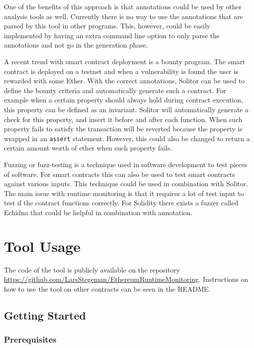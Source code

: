\documentclass[a4paper]{article}
\begin{document}
One of the benefits of this approach is that annotations could be used by other analysis tools as well. Currently there is no way to use the annotations that are parsed by this tool in other programs. This, however, could be easily implemented by having an extra command line option to only parse the annotations and not go in the generation phase. \par
A recent trend with smart contract deployment is a bounty program. The smart contract is deployed on a testnet and when a vulnerability is found the user is rewarded with some Ether. With the correct annotations, Solitor can be used to define the bounty criteria and automatically generate such a contract. For example when a certain property should always hold during contract execution, this property can be defined as an invariant. Solitor will automatically generate a check for this property, and insert it before and after each function. When such property fails to satisfy the transaction will be reverted because the property is wrapped in an \texttt{assert} statement. However, this could also be changed to return a certain amount worth of ether when such property fails. \par
Fuzzing or fuzz-testing is a technique used in software development to test pieces of software. For smart contracts this can also be used to test smart contracts against various inputs. This technique could be used in combination with Solitor. The main issue with runtime monitoring is that it requires a lot of test input to test if the contract functions correctly. For Solidity there exists a fuzzer called Echidna \cite{echidnafuzzer} that could be helpful in combination with annotation.

\newpage
\appendix
\section{Tool Usage}
\label{app:toolusage}
The code of the tool is publicly available on the repository \url{https://github.com/LarsStegeman/EthereumRuntimeMonitoring}. Instructions on how to use the tool on other contracts can be seen in the README.

\hypertarget{getting-started}{%
\subsection{Getting Started}\label{getting-started}}

\hypertarget{prerequisites}{%
\subsubsection{Prerequisites}\label{prerequisites}}
\end{document}
